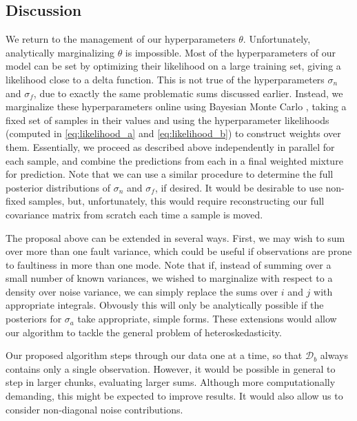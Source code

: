 \documentclass{article}
\newcommand{\cm}[1]{\ensuremath{\mathcal{#1}}}
\newcommand{\data}{\ensuremath{\cm{D}}}
\begin{document}

\subsection{Discussion}

We return to the management of our hyperparameters
$\theta$. Unfortunately, analytically marginalizing $\theta$ is
impossible. Most of the hyperparameters of our model can be set by
optimizing their likelihood on a large training set, giving a
likelihood close to a delta function. This is not true of the
hyperparameters $\sigma_n$ and $\sigma_f$, due to exactly the same
problematic sums discussed earlier. Instead, we marginalize these
hyperparameters online using Bayesian Monte Carlo \citep[Chapter
  7]{osbornebayesian}, taking a fixed set of samples in their values
and using the hyperparameter likelihoods (computed in
\eqref{eq:likelihood_a} and \eqref{eq:likelihood_b}) to construct
weights over them. Essentially, we proceed as described above
independently in parallel for each sample, and combine the predictions
from each in a final weighted mixture for prediction. Note that we can
use a similar procedure \citep{garnettosborne} to determine the full
posterior distributions of $\sigma_n$ and $\sigma_f$, if desired.  It
would be desirable to use non-fixed samples, but, unfortunately, this
would require reconstructing our full covariance matrix from
scratch each time a sample is moved.

The proposal above can be extended in several ways. First, we may wish
to sum over more than one fault variance, which could be useful if
observations are prone to faultiness in more than one mode.  Note that
if, instead of summing over a small number of known variances, we
wished to marginalize with respect to a density over noise variance,
we can simply replace the sums over $i$ and $j$ with appropriate
integrals. Obvously this will only be analytically possible if the
posteriors for $\sigma_a$ take appropriate, simple forms.  These
extensions would allow our algorithm to tackle the general problem of
heteroskedasticity.

Our proposed algorithm steps through our data one at a time, so that
$\data_b$ always contains only a single observation. However, it would
be possible in general to step in larger chunks, evaluating larger
sums. Although more computationally demanding, this might be expected
to improve results. It would also allow us to consider non-diagonal
noise contributions.
\end{document}
